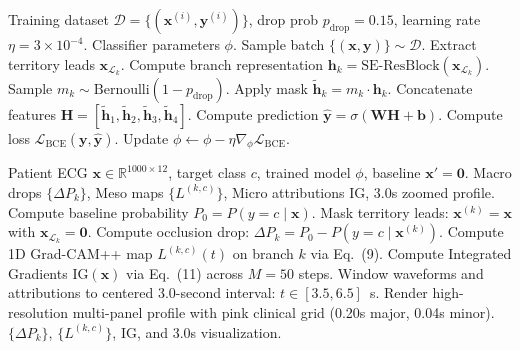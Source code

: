\documentclass[12pt]{elsarticle}
\begin{document}
\begin{algorithm}[t]
\caption{Anatomical Territory-Dropout Classifier Training}
\label{alg:classifier_training}
\begin{algorithmic}[1]
\REQUIRE Training dataset $\mathcal{D} = \{(\mathbf{x}^{(i)}, \mathbf{y}^{(i)})\}$, drop prob $p_{\text{drop}} = 0.15$, learning rate $\eta = 3\times 10^{-4}$.
\ENSURE Classifier parameters $\phi$.
    \STATE Sample batch $\{(\mathbf{x}, \mathbf{y})\} \sim \mathcal{D}$.
        \STATE Extract territory leads $\mathbf{x}_{\mathcal{L}_k}$.
        \STATE Compute branch representation $\mathbf{h}_k = \text{SE-ResBlock}(\mathbf{x}_{\mathcal{L}_k})$.
        \STATE Sample $m_k \sim \text{Bernoulli}(1 - p_{\text{drop}})$.
        \STATE Apply mask $\tilde{\mathbf{h}}_k = m_k \cdot \mathbf{h}_k$.
    \ENDFOR
    \STATE Concatenate features $\mathbf{H} = [\tilde{\mathbf{h}}_1, \tilde{\mathbf{h}}_2, \tilde{\mathbf{h}}_3, \tilde{\mathbf{h}}_4]$.
    \STATE Compute prediction $\hat{\mathbf{y}} = \sigma(\mathbf{W} \mathbf{H} + \mathbf{b})$.
    \STATE Compute loss $\mathcal{L}_{\text{BCE}}(\mathbf{y}, \hat{\mathbf{y}})$.
    \STATE Update $\phi \leftarrow \phi - \eta \nabla_\phi \mathcal{L}_{\text{BCE}}$.
\ENDWHILE
\end{algorithmic}
\end{algorithm}

\begin{algorithm}[t]
\caption{Multi-Scale Anatomical Attribution Inference}
\label{alg:xai_inference}
\begin{algorithmic}[1]
\REQUIRE Patient ECG $\mathbf{x} \in \mathbb{R}^{1000 \times 12}$, target class $c$, trained model $\phi$, baseline $\mathbf{x}' = \mathbf{0}$.
\ENSURE Macro drops $\{\Delta P_k\}$, Meso maps $\{L^{(k, c)}\}$, Micro attributions $\text{IG}$, 3.0s zoomed profile.
\STATE Compute baseline probability $P_0 = P(y = c \mid \mathbf{x})$.
    \STATE Mask territory leads: $\mathbf{x}^{(k)} = \mathbf{x}$ with $\mathbf{x}_{\mathcal{L}_k} = \mathbf{0}$.
    \STATE Compute occlusion drop: $\Delta P_k = P_0 - P(y = c \mid \mathbf{x}^{(k)})$.
    \STATE Compute 1D Grad-CAM++ map $L^{(k, c)}(t)$ on branch $k$ via Eq.~(9).
\ENDFOR
\STATE Compute Integrated Gradients $\text{IG}(\mathbf{x})$ via Eq.~(11) across $M=50$ steps.
\STATE Window waveforms and attributions to centered 3.0-second interval: $t \in [3.5, 6.5]$~s.
\STATE Render high-resolution multi-panel profile with pink clinical grid (0.20s major, 0.04s minor).
\RETURN $\{\Delta P_k\}$, $\{L^{(k, c)}\}$, $\text{IG}$, and 3.0s visualization.
\end{algorithmic}
\end{algorithm}
\end{document}

